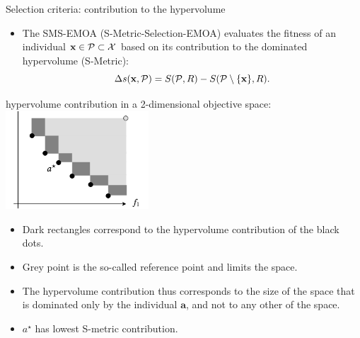 \begin{frame}[allowframebreaks]{Selection criteria: contribution to the hypervolume}

\begin{itemize}
\item The SMS-EMOA (S-Metric-Selection-EMOA) evaluates the fitness of an individual $\mathbf{x} \in \mathcal{P} \subset \mathcal{X}$ based on its contribution to the dominated hypervolume (S-Metric):
$$
\Delta s(\mathbf{x}, \mathcal{P}) = S(\mathcal{P}, R) - S(\mathcal{P} \setminus \{ \mathbf{x}\}, R).
$$
\end{itemize}



\framebreak

\begin{center}
hypervolume contribution in a 2-dimensional objective space:\\
\includegraphics[width = 0.4\textwidth]{images/hypervolumenbeitrag.png}
\end{center}

\footnotesize
\vspace*{-0.5cm}
\begin{itemize}
\item Dark rectangles correspond to the hypervolume contribution of the black dots.
\item Grey point is the so-called reference point and limits the space.
\item The hypervolume contribution thus corresponds to the size of the space that is dominated only by the individual $\bm{a}$, and not to any other of the space.
\item $a^\star$ has lowest S-metric contribution.
\end{itemize}
\end{frame}

